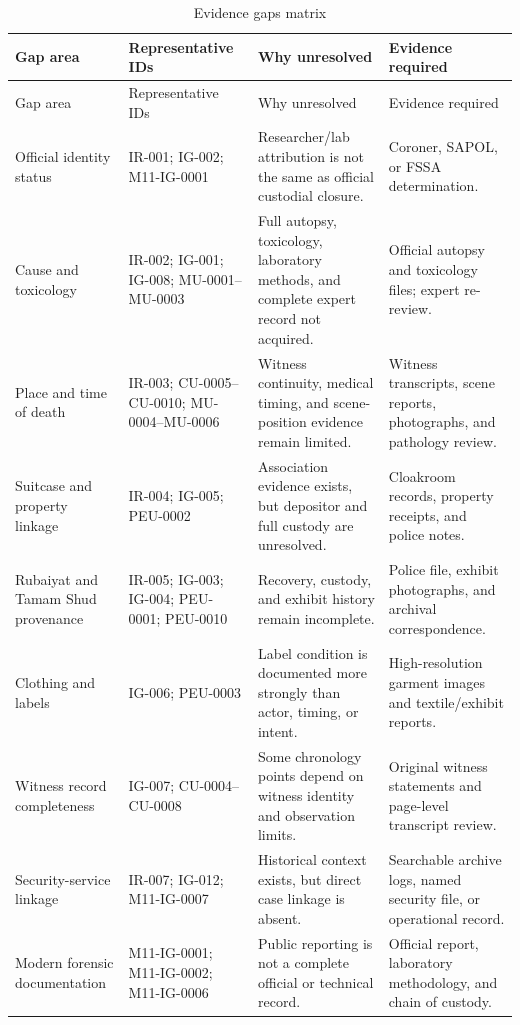 \begingroup
\scriptsize
\setlength{\tabcolsep}{2pt}
\renewcommand{\arraystretch}{1.12}
\begin{longtable}{>{\raggedright\arraybackslash}p{}>{\raggedright\arraybackslash}p{}>{\raggedright\arraybackslash}p{}>{\raggedright\arraybackslash}p{}}
\caption{Evidence gaps matrix}\label{tab:chapter11-evidence-gaps}\\
\toprule
Gap area & Representative IDs & Why unresolved & Evidence required \\
\midrule
\endfirsthead
\toprule
Gap area & Representative IDs & Why unresolved & Evidence required \\
\midrule
\endhead
Official identity status & IR-001; IG-002; M11-IG-0001 & Researcher/lab attribution is not the same as official custodial closure. & Coroner, SAPOL, or FSSA determination. \\
Cause and toxicology & IR-002; IG-001; IG-008; MU-0001--MU-0003 & Full autopsy, toxicology, laboratory methods, and complete expert record not acquired. & Official autopsy and toxicology files; expert re-review. \\
Place and time of death & IR-003; CU-0005--CU-0010; MU-0004--MU-0006 & Witness continuity, medical timing, and scene-position evidence remain limited. & Witness transcripts, scene reports, photographs, and pathology review. \\
Suitcase and property linkage & IR-004; IG-005; PEU-0002 & Association evidence exists, but depositor and full custody are unresolved. & Cloakroom records, property receipts, and police notes. \\
Rubaiyat and Tamam Shud provenance & IR-005; IG-003; IG-004; PEU-0001; PEU-0010 & Recovery, custody, and exhibit history remain incomplete. & Police file, exhibit photographs, and archival correspondence. \\
Clothing and labels & IG-006; PEU-0003 & Label condition is documented more strongly than actor, timing, or intent. & High-resolution garment images and textile/exhibit reports. \\
Witness record completeness & IG-007; CU-0004--CU-0008 & Some chronology points depend on witness identity and observation limits. & Original witness statements and page-level transcript review. \\
Security-service linkage & IR-007; IG-012; M11-IG-0007 & Historical context exists, but direct case linkage is absent. & Searchable archive logs, named security file, or operational record. \\
Modern forensic documentation & M11-IG-0001; M11-IG-0002; M11-IG-0006 & Public reporting is not a complete official or technical record. & Official report, laboratory methodology, and chain of custody. \\
\bottomrule
\end{longtable}
\endgroup

